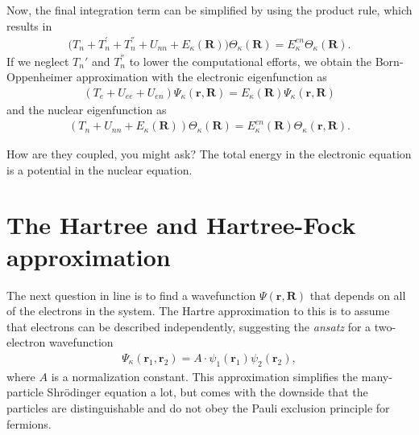 Now, the final integration term can be simplified by using the product rule, which results in
\begin{align}
    \Big( T_n+T_n^{'} + T_n^{''} +U_{nn} + E_\kappa(\textbf{R}) \Big)\Theta_\kappa(\textbf{R}) = E_\kappa^{en}\Theta_\kappa (\textbf{R}).
\end{align}
If we neglect $T_n'$ and $T_n^{''}$ to lower the computational efforts, we obtain the Born-Oppenheimer approximation with the electronic eigenfunction as
\begin{align}
    \left( T_e + U_{ee} + U_{en} \right) \Psi_\kappa (\textbf{r},\textbf{R}) = E_{\kappa}(\textbf{R})\Psi_\kappa(\textbf{r},\textbf{R})
\end{align}
and the nuclear eigenfunction as
\begin{align}
    \left(T_n + U_{nn} + E_\kappa (\textbf{R}) \right) \Theta_\kappa(\textbf{R})= E_{\kappa}^{en}(\textbf{R})\Theta_\kappa(\textbf{r},\textbf{R}).
\end{align}

How are they coupled, you might ask? The total energy in the electronic equation is a potential in the nuclear equation.


\section{The Hartree and Hartree-Fock approximation}
\begin{comment}
As we venture along from a one-electron system to a two-electron systen, we encounter a new wavefunction and Hamiltonian that needs to describe two particles, making the two-electron Schrödinger equation read

\begin{align}
  \Big( -\frac{\hslash^2 \nabla_1^2}{2m_e} - \frac{\hslash^2\nabla_2^2}{2m_e}+ \frac{q^2}{\lvert r_1-r_2  \rvert} + V_{ext}(r) \Big) \Psi_\kappa (r_1, r_2) = E_{\kappa} \Psi_\kappa (r_1, r_2),
\end{align}
where the two first terms are the kinetic energies of the electrons, while the third term is a potential that describes the repulsive Coloumb interaction between the two electrons. The last term is the external potential, well known from the earlier scenario with only one electron.
\end{comment}
The next question in line is to find a wavefunction $\Psi(\textbf{r},\textbf{R})$ that depends on all of the electrons in the system. The Hartre \cite{Persson2020} approximation to this is to assume that electrons can be described independently, suggesting the \textit{ansatz} for a two-electron wavefunction
\begin{align}
  \Psi_\kappa(\textbf{r}_1,\textbf{r}_2) = A \cdot \psi_1(\textbf{r}_1) \psi_2(\textbf{r}_2),
\end{align}
where $A$ is a normalization constant. This approximation simplifies the many-particle Shrödinger equation a lot, but comes with the downside that the particles are distinguishable and do not obey the Pauli exclusion principle for fermions.

